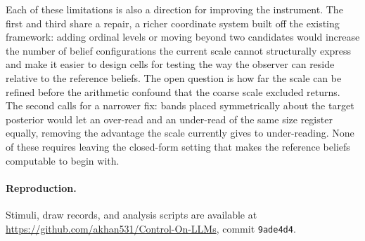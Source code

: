 \documentclass{article}
\theoremstyle{plain}
\theoremstyle{definition}
\theoremstyle{remark}
\begin{document}
Each of these limitations is also a direction for improving the instrument. The first and
third share a repair, a richer coordinate system built off the existing framework:
adding ordinal levels or moving
beyond two candidates would increase the number of belief configurations the current scale
cannot structurally express and make it easier to design cells for testing the way the observer 
can reside relative to the reference beliefs.
The open question is how far the scale can be refined before the arithmetic confound
that the coarse scale excluded returns. The second calls
for a narrower fix: bands placed symmetrically about the target posterior would let an
over-read and an under-read of the same size register equally, removing the
advantage the scale currently gives to under-reading. None of these requires
leaving the closed-form setting that makes the reference beliefs computable to begin with.

\paragraph{Reproduction.} Stimuli, draw records, and analysis scripts are
available at \url{https://github.com/akhan531/Control-On-LLMs}, commit
\texttt{9ade4d4}.

\end{document}
